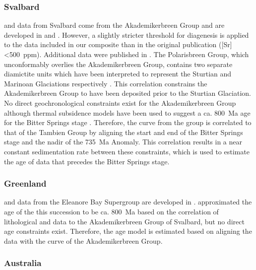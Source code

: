 \subsubsection{Svalbard}

\dC and \SrSr data from Svalbard come from the Akademikerbreen Group and are developed in \citet{Halverson2007b} and \citet{Halverson2007a}. However, a slightly stricter threshold for \SrSr diagenesis is applied to the data included in our composite than in the original publication ([Sr]\textless500~ppm). Additional \SrSr data were published in \citet{Cox2016a}. The Polarisbreen Group, which unconformably overlies the Akademikerbreen Group, contains two separate diamictite units which have been interpreted to represent the Sturtian and Marinoan Glaciations respectively \citep{Halverson2004a}. This correlation constrains the Akademikerbreen Group to have been deposited prior to the Sturtian Glaciation. No direct geochronological constraints exist for the Akademikerbreen Group although thermal subsidence models have been used to suggest a ca. 800~Ma age for the Bitter Springs stage \citep{Maloof2006a}. Therefore, the \dC curve from the group is correlated to that of the Tambien Group by aligning the start and end of the Bitter Springs stage and the nadir of the 735~Ma Anomaly. This correlation results in a near constant sedimentation rate between these constraints, which is used to estimate the age of data that precedes the Bitter Springs stage.

\subsubsection{Greenland}

\dC and \SrSr data from the Eleanore Bay Supergroup are developed in \citet{Cox2016a}. \citet{Halverson2004a} approximated the age of the this succession to be ca. 800~Ma based on the correlation of lithological and \dC data to the Akademikerbreen Group of Svalbard, but no direct age constraints exist. Therefore, the age model is estimated based on aligning the \dC data with the \dC curve of the Akademikerbreen Group.

\subsubsection{Australia}

